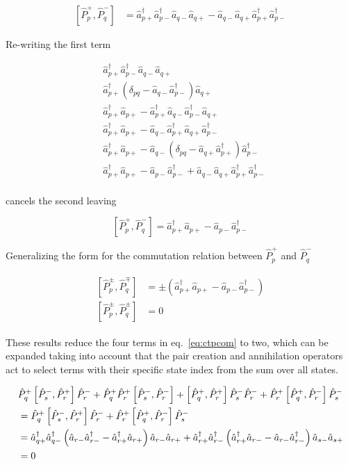 \documentclass[11pt]{article}
\newcommand{\cop}[2]{%
	\ensuremath{ \hat{a} _{#1 #2} ^{\dagger} }}
\newcommand{\aop}[2]{%
	\ensuremath{ \hat{a} _{#1 #2} }}
\newcommand{\pcop}[1]{%
	\ensuremath{ \cop{#1}{+} \cop{#1}{-} } }
\newcommand{\paop}[1]{%
	\ensuremath{ \aop{#1}{-} \aop{#1}{+} } }
\newcommand{\krondelt}[2]{%
	\ensuremath{ \delta _{#1 #2} }}
\newcommand{\ppop}[1]{%
	\ensuremath{ \hat{P} _{#1} ^+ } }
\newcommand{\pmop}[1]{%
	\ensuremath{ \hat{P} _{#1} ^- } }
\newcommand{\commutator}[2]{%
	\ensuremath{ \left [ #1,#2 \right ] }}
\begin{document}
\begin{align*}
	\commutator{\ppop{p}}{\pmop{q}} &= \cop{p}{+} \cop{p}{-} \aop{q}{-} \aop{q}{+} - \aop{q}{-} \aop{q}{+} \cop{p}{+} \cop{p}{-}
\end{align*}

Re-writing the first term

\begin{align*}
	& \cop{p}{+} \cop{p}{-} \aop{q}{-} \aop{q}{+}\\
	& \cop{p}{+} \left ( \krondelt{p}{q} - \aop{q}{-} \cop{p}{-} \right ) \aop{q}{+}\\
	& \cop{p}{+} \aop{p}{+} - \cop{p}{+} \aop{q}{-} \cop{p}{-} \aop{q}{+}\\
	& \cop{p}{+} \aop{p}{+} - \aop{q}{-} \cop{p}{+} \aop{q}{+} \cop{p}{-}\\
	& \cop{p}{+} \aop{p}{+} - \aop{q}{-} \left ( \krondelt{p}{q} - \aop{q}{+} \cop{p}{+} \right ) \cop{p}{-}\\
	& \cop{p}{+} \aop{p}{+} -  \aop{p}{-} \cop{p}{-} + \aop{q}{-} \aop{q}{+} \cop{p}{+} \cop{p}{-}\\
\end{align*}

cancels the second leaving

\begin{equation}
	\commutator{\ppop{p}}{\pmop{q}} = \cop{p}{+} \aop{p}{+} -  \aop{p}{-} \cop{p}{-} \nonumber
\end{equation}

Generalizing the form for the commutation relation between \ppop{p} and \pmop{q}

\begin{align}
\begin{split}
	\commutator{\hat{P} _p ^{\pm} }{\hat{P} _q ^{\mp}} &= \pm ( \cop{p}{+} \aop{p}{+} - \aop{p}{-} \cop{p}{-})\\
	\commutator{\hat{P} _p ^{\pm}}{\hat{P} _q ^{\pm}} &= 0
\end{split}
\label{eq:ppmcom}
\end{align}

These results reduce the four terms in eq.~\ref{eq:ctpcom} to two, which can be expanded taking into account that the pair creation and annihilation operators act to select terms with their specific state index from the sum over all states.

\begin{align*}
	&\ppop{q} \commutator{\pmop{s}}{\ppop{r}} \pmop{r} + \ppop{q} \ppop{r} \commutator{\pmop{s}}{\pmop{r}} + \commutator{\ppop{q}}{\ppop{r}} \pmop{s} \pmop{r} +  \ppop{r} \commutator{\ppop{q}}{\pmop{r}} \pmop{s}\\
	&= \ppop{q} \commutator{\pmop{s}}{\ppop{r}} \pmop{r} +  \ppop{r} \commutator{\ppop{q}}{\pmop{r}} \pmop{s}\\
	&= \pcop{q} \left ( \aop{r}{-} \cop{r}{-} - \cop{r}{+} \aop{r}{+} \right ) \paop{r} + \pcop{r} \left ( \cop{r}{+} \aop{r}{-} - \aop{r}{-} \cop{r}{-} \right ) \paop{s}\\
	&= 0
\end{align*}
\end{document}
